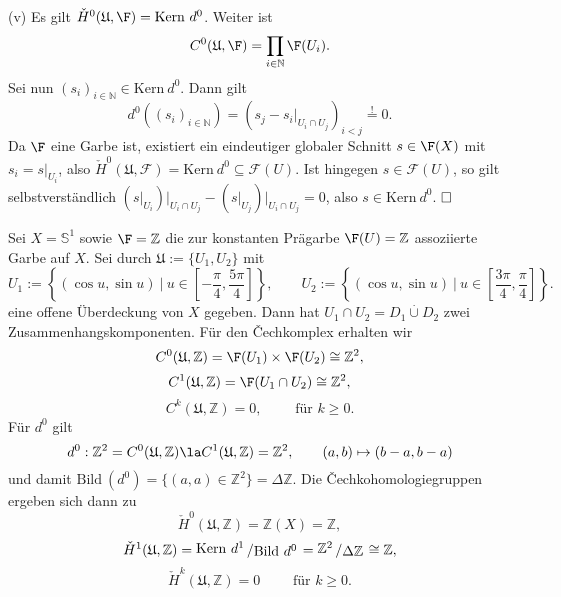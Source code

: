\documentclass[11pt]{book}
\theoremstyle{nonumberbreak}
\newenvironment{pr}[1][]{\ifthenelse{\equal{#1}{}}{\proof}{\proof[#1]}\rm}{\endproof}
\newenvironment{ex}[1][]{\ifthenelse{\equal{#1}{}}{\example}{\example[#1]}\rm}{\endexample}
\newenvironment{definbem}[1][]{\ifthenelse{\equal{#1}{}}{\definibem}{\definibem[#1]}\rm}{\enddefinibem}
\newcommand{\bild}{\mathrm{Bild}\ }
\newcommand{\kernel}{\mathrm{Kern}\ }
\newcommand{\slant}[2]{{\raisebox{.1em}{$#1$}\left/\raisebox{-.1em}{$#2$}\right.}}
\begin{document}
\begin{spacing}{1.4}
\begin{definbem}
\begin{pr}
\begin{compactenum}
\begin{compactenum}
\end{compactenum}
\item[(v)] Es gilt $\check{H}^{0}(\mathfrak{U}, \F) = \kernel d^{0}$. Weiter ist 
$$C^{0}(\mathfrak{U}, \F) = \prod_{i \in \mathbb{N}} \F(U_i).$$
Sei nun $(s_i)_{i \in \mathbb{N}} \in \kernel d^{0}$. Dann gilt 
$$d^{0}((s_i)_{i \in \mathbb{N}}) = (s_j-s_i \vert_{U_i \cap U_j})_{i < j} \overset{!}{=} 0.$$
Da $\F$ eine Garbe ist, existiert ein eindeutiger globaler Schnitt $s \in \F(X)$ mit $s_i = s \vert_{U_i}$, also $\check{H}^{0}(\mathfrak{U}, \mathcal{F}) = \kernel d^{0} \subseteq \mathcal{F}(U)$. Ist hingegen $s \in \mathcal{F}(U)$, so gilt selbstverständlich $(s\vert_{U_i})\vert_{U_i \cap U_j} - (s\vert_{U_j})\vert_{U_i \cap U_j} = 0$, also $s \in \kernel d^{0}$. $\hfill \Box$
\end{compactenum}
\end{pr}
\end{definbem}


\begin{ex}   %

Sei $X= \mathbb{S}^{1}$ sowie $\F= \mathbb{Z}$ die zur konstanten Prägarbe $\F(U)=\mathbb{Z}$ assoziierte Garbe auf $X$. Sei durch $\mathfrak{U}:= \{U_1, U_2\}$ mit 
$$U_1:= \left\{ \left( \cos u, \sin u\right) \ \big\vert \ u \in \left[- \frac{\pi}{4}, \frac{5 \pi}{4} \right] \right\}, \qquad U_2:= \left\{ \left( \cos u, \sin u\right) \ \big\vert \ u \in \left[\frac{3\pi}{4}, \frac{ \pi}{4} \right] \right\}.$$
eine offene Überdeckung von $X$ gegeben. Dann hat $U_1 \cap U_2 = D_1 \overset{.}{\cup} D_2$ zwei Zusammenhangskomponenten. Für den \v{C}echkomplex erhalten wir 
$$C^{0}(\mathfrak{U}, \mathbb{Z}) = \F(U_1) \times \F(U_2) \cong \mathbb{Z}^2,$$
$$C^{1}(\mathfrak{U}, \mathbb{Z}) = \F(U_1 \cap U_2) \cong \mathbb{Z}^2,$$
$$C^{k}(\mathfrak{U}, \mathbb{Z}) = 0, \qquad \textrm{ für } k \geqslant 0.$$
Für $d^{0}$ gilt 
$$d^{0}: \mathbb{Z}^2 = C^{0}(\mathfrak{U}, \mathbb{Z}) \la C^{1}(\mathfrak{U}, \mathbb{Z})= \mathbb{Z}^2, \qquad (a,b) \mapsto (b-a, b-a) $$
und damit $\bild(d^{0}) = \{(a,a) \in \mathbb{Z}^2 \} = \Delta \mathbb{Z}$. Die \v{C}echkohomologiegruppen ergeben sich dann zu 
$$\check{H}^{0}(\mathfrak{U}, \mathbb{Z}) = \mathbb{Z}(X) = \mathbb{Z}, $$
$$\check{H}^{1}(\mathfrak{U}, \mathbb{Z}) = \slant{\kernel d^{1}}{\bild d^{0}} = \slant{\mathbb{Z}^2}{\Delta \mathbb{Z}} \cong \mathbb{Z},$$
$$\check{H}^{k}(\mathfrak{U}, \mathbb{Z}) = 0 \qquad \textrm{ für } k \geqslant 0.$$

\end{ex}




\end{spacing}
\end{document}
